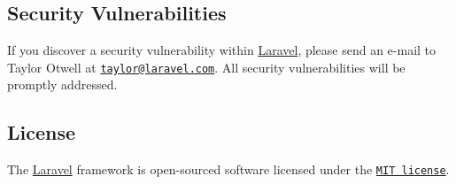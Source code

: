 \subsection*{Security Vulnerabilities}

If you discover a security vulnerability within \mbox{\hyperlink{namespace_laravel}{Laravel}}, please send an e-\/mail to Taylor Otwell at \href{mailto:taylor@laravel.com}{\tt taylor@laravel.\+com}. All security vulnerabilities will be promptly addressed.

\subsection*{License}

The \mbox{\hyperlink{namespace_laravel}{Laravel}} framework is open-\/sourced software licensed under the \href{http://opensource.org/licenses/MIT}{\tt M\+IT license}. 